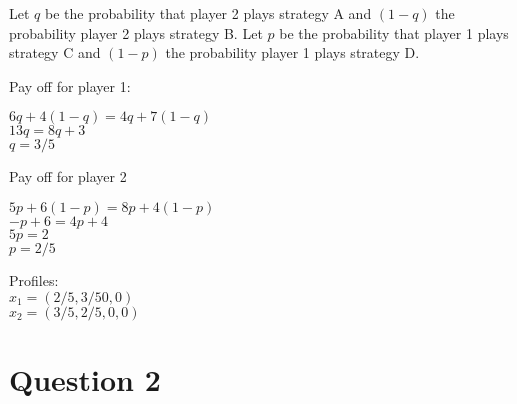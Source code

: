 \documentclass[11pt]{report}
\begin{document}
Let $q$ be the probability that player 2 plays strategy A and $(1 - q)$ the probability player 2 plays strategy B.
Let $p$ be the probability that player 1 plays strategy C and $(1 - p)$ the probability player 1 plays strategy D.

Pay off for player 1:
\begin{center}
$6q + 4(1 - q) = 4q + 7(1 - q)$ \\
$13q = 8q + 3$\\
$q = 3/5$\\
\end{center}

Pay off for player 2
\begin{center}
$5p + 6(1 - p) = 8p + 4(1 - p)$\\
$-p + 6 = 4p + 4$\\
$5p = 2$\\
$p = 2 / 5$
\end{center}

Profiles:\\
$x_{1} = (2/5, 3/5 0, 0)$ \\
$x_{2} = (3/5, 2/5, 0, 0)$ \\

\section{Question 2}
\end{document}
